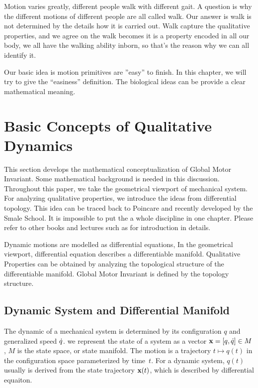 Motion varies greatly, different people walk with different gait. 
A question is why the different motions of different people are all called walk.
Our answer is walk is not determined by the details how it is carried out.
Walk capture the qualitative properties, and we agree on the walk becomes it is a property encoded in all our body, we all have the walking ability inborn, so that’s the reason why we can all identify it.


Our basic idea is motion primitives are ''easy'' to finish. 
In this chapter, we will try to give the “easiness” definition.
The biological ideas can be provide a clear mathematical meaning.


\section{Basic Concepts of Qualitative Dynamics}
This section develops the mathematical conceptualization of Global Motor Invariant.
Some mathematical background is needed in this discussion.
Throughout this paper, we take the geometrical viewport of mechanical system.
For analyzing qualitative properties, we introduce the ideas from differential topology.
This idea can be traced back to Poincare\citep{Poincar'e1899,Poincar'e1885} and recently developed by the Smale School\citep{Smale1970}.
It is impossible to put the a whole discipline in one chapter.
Please refer to other books and lectures such as \citep{abraham1978foundations}for introduction in details.


Dynamic motions are modelled as differential equations,
In the geometrical viewport, differential equation describes a differentiable manifold.
Qualitative Properties can be obtained by analyzing the topological structure of the differentiable manifold.
Global Motor Invariant is defined by the topology structure.



\subsection{Dynamic System and Differential Manifold}



The dynamic of a mechanical system is determined by its configuration  $q$ and generalized speed $\dot{q}$. 
we represent the state of a system as a vector $\mathbf{x}=[q,\dot{q}] \in M$,  $M$ is the state space, or state manifold.
The motion is a trajectory $t \mapsto q(t)$ in the configuration space parameterized by time~$t$.
For a dynamic system, $q(t)$ usually is derived from the state trajectory $\mathbf{x}(t)$, which is described by differential equaiton. 


